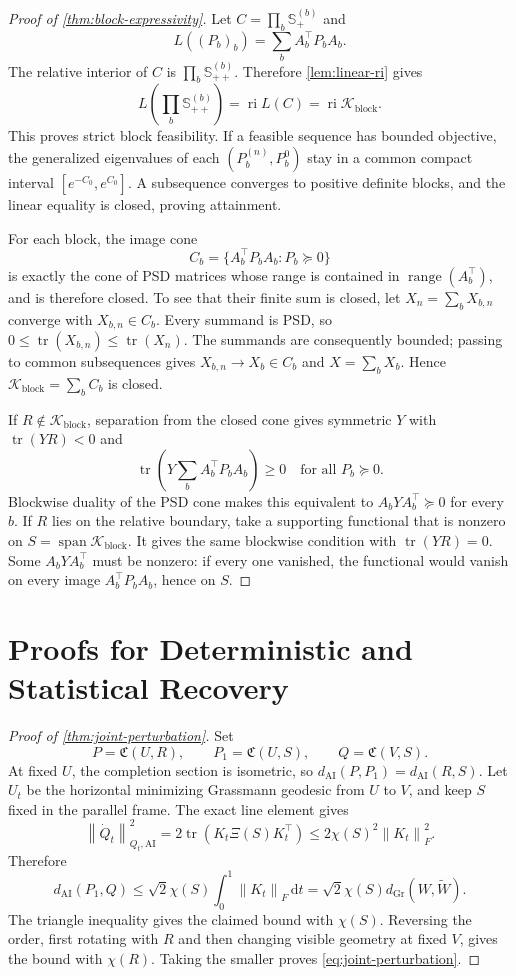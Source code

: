 \documentclass[10pt]{article}
\theoremstyle{plain}
\theoremstyle{definition}
\theoremstyle{remark}
\newcommand{\SPD}{\mathbb S_{++}}
\newcommand{\PSD}{\mathbb S_{+}}
\newcommand{\AI}{\mathrm{AI}}
\newcommand{\Gr}{\mathrm{Gr}}
\newcommand{\tr}{\operatorname{tr}}
\newcommand{\range}{\operatorname{range}}
\newcommand{\ri}{\operatorname{ri}}
\newcommand{\fro}[1]{\left\lVert #1\right\rVert_F}
\newcommand{\norm}[1]{\left\lVert #1\right\rVert}
\newcommand{\dd}{\mathrm d}
\newcommand{\dai}{d_{\AI}}
\newcommand{\dgr}{d_{\Gr}}
\newcommand{\Cpl}{\mathfrak C}
\newcommand{\Xiop}{\Xi}
\newcommand{\Kcal}{\mathcal K}
\begin{document}
\begin{proof}[Proof of \cref{thm:block-expressivity}]
Let \(C=\prod_b\PSD^{(b)}\) and
\[
  L((P_b)_b)=\sum_bA_b^\top P_bA_b.
\]
The relative interior of \(C\) is \(\prod_b\SPD^{(b)}\).  Therefore
\cref{lem:linear-ri} gives
\[
  L\!\left(\prod_b\SPD^{(b)}\right)
  =\ri L(C)=\ri\Kcal_{\mathrm{block}}.
\]
This proves strict block feasibility.  If a feasible sequence has bounded
objective, the generalized eigenvalues of each
\((P_b^{(n)},P_b^0)\) stay in a common compact interval
\([e^{-C_0},e^{C_0}]\).  A subsequence converges to positive definite blocks,
and the linear equality is closed, proving attainment.

For each block, the image cone
\[
  C_b=\{A_b^\top P_bA_b:P_b\succeq0\}
\]
is exactly the cone of PSD matrices whose range is contained in
\(\range(A_b^\top)\), and is therefore closed.  To see that their finite sum
is closed, let \(X_n=\sum_bX_{b,n}\) converge with \(X_{b,n}\in C_b\).
Every summand is PSD, so
\(0\le\tr(X_{b,n})\le\tr(X_n)\).  The summands are consequently bounded;
passing to common subsequences gives \(X_{b,n}\to X_b\in C_b\) and
\(X=\sum_bX_b\).  Hence
\(\Kcal_{\mathrm{block}}=\sum_bC_b\) is closed.

If \(R\notin\Kcal_{\mathrm{block}}\), separation from the closed
cone gives symmetric \(Y\) with \(\tr(YR)<0\) and
\[
  \tr\!\left(Y\sum_bA_b^\top P_bA_b\right)\ge0
  \quad\text{for all }P_b\succeq0.
\]
Blockwise duality of the PSD cone makes this equivalent to
\(A_bYA_b^\top\succeq0\) for every \(b\).  If \(R\) lies on the relative
boundary, take a supporting functional that is nonzero on
\(S=\operatorname{span}\Kcal_{\mathrm{block}}\).  It gives the same
blockwise condition with \(\tr(YR)=0\).  Some
\(A_bYA_b^\top\) must be nonzero: if every one vanished, the functional
would vanish on every image \(A_b^\top P_bA_b\), hence on \(S\).
\end{proof}

\section{Proofs for Deterministic and Statistical Recovery}
\label{app:recovery-proofs}

\begin{proof}[Proof of \cref{thm:joint-perturbation}]
Set
\[
  P=\Cpl(U,R),
  \qquad
  P_1=\Cpl(U,S),
  \qquad
  Q=\Cpl(V,S).
\]
At fixed \(U\), the completion section is isometric, so
\(\dai(P,P_1)=\dai(R,S)\).  Let \(U_t\) be the horizontal minimizing
Grassmann geodesic from \(U\) to \(V\), and keep \(S\) fixed in the parallel
frame.  The exact line element gives
\[
  \norm{\dot Q_t}_{Q_t,\AI}^2
  =2\tr(K_t\Xiop(S)K_t^\top)
  \le2\chi(S)^2\fro{K_t}^2.
\]
Therefore
\[
  \dai(P_1,Q)
  \le\sqrt2\chi(S)\int_0^1\fro{K_t}\,\dd t
  =\sqrt2\chi(S)\dgr(W,\widetilde W).
\]
The triangle inequality gives the claimed bound with \(\chi(S)\).  Reversing
the order, first rotating with \(R\) and then changing visible geometry at
fixed \(V\), gives the bound with \(\chi(R)\).  Taking the smaller proves
\eqref{eq:joint-perturbation}.
\end{proof}
\end{document}

